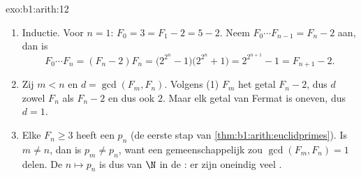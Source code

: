 \begin{solution}{exo:b1:arith:12}
\begin{enumerate}
  \item Inductie. Voor $n = 1$: $F_0 = 3 = F_1 - 2 = 5 - 2$. Neem
        $F_0\cdots F_{n-1} = F_n - 2$ aan, dan is
        \[
        F_0 \cdots F_n = (F_n - 2)F_n
        = \bigl(2^{2^n} - 1\bigr)\bigl(2^{2^n} + 1\bigr)
        = 2^{2^{n+1}} - 1 = F_{n+1} - 2 .
        \]
  \item Zij $m < n$ en $d = \gcd(F_m, F_n)$. Volgens (1)  $F_m$
        het getal $F_n - 2$, dus  $d$ zowel $F_n$ als $F_n - 2$ en
        dus ook $2$. Maar elk getal van Fermat is oneven, dus $d = 1$.
  \item Elke $F_n \geq 3$ heeft een  $p_n$ (de eerste stap
        van \cref{thm:b1:arith:euclidprimes}). Is $m \neq n$, dan is
        $p_m \neq p_n$, want een gemeenschappelijk  zou
        $\gcd(F_m, F_n) = 1$ delen. De  $n \mapsto p_n$ is dus
         van $\N$ in de : er zijn oneindig veel
        .
\end{enumerate}
\end{solution}

